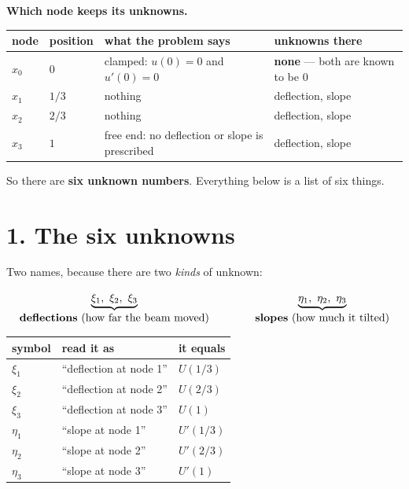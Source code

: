 \documentclass[11pt]{article}
\begin{document}
\textbf{Which node keeps its unknowns.}
\begin{center}\small
\renewcommand{\arraystretch}{1.25}
\begin{tabular}{@{}llll@{}}
\toprule
node & position & what the problem says & unknowns there\\
\midrule
$x_{0}$ & $0$ & clamped: $u(0)=0$ and $u'(0)=0$ & \textbf{none} --- both are known to be $0$\\
$x_{1}$ & $1/3$ & nothing & deflection, slope\\
$x_{2}$ & $2/3$ & nothing & deflection, slope\\
$x_{3}$ & $1$ & free end: no deflection or slope is prescribed & deflection, slope\\
\bottomrule
\end{tabular}
\end{center}

So there are \textbf{six unknown numbers}.  Everything below is a list of six
things.

\section*{1. The six unknowns}

Two names, because there are two \emph{kinds} of unknown:

\[
  \underbrace{\xi_{1},\ \xi_{2},\ \xi_{3}}_{\textstyle\text{\textbf{deflections} (how far the beam moved)}}
  \qquad\qquad
  \underbrace{\eta_{1},\ \eta_{2},\ \eta_{3}}_{\textstyle\text{\textbf{slopes} (how much it tilted)}}
\]

\begin{center}\small
\renewcommand{\arraystretch}{1.25}
\begin{tabular}{@{}lll@{}}
\toprule
symbol & read it as & it equals\\
\midrule
$\xi_{1}$  & ``deflection at node 1'' & $U(1/3)$\\
$\xi_{2}$  & ``deflection at node 2'' & $U(2/3)$\\
$\xi_{3}$  & ``deflection at node 3'' & $U(1)$\\
$\eta_{1}$ & ``slope at node 1''      & $U'(1/3)$\\
$\eta_{2}$ & ``slope at node 2''      & $U'(2/3)$\\
$\eta_{3}$ & ``slope at node 3''      & $U'(1)$\\
\bottomrule
\end{tabular}
\end{center}
\end{document}

